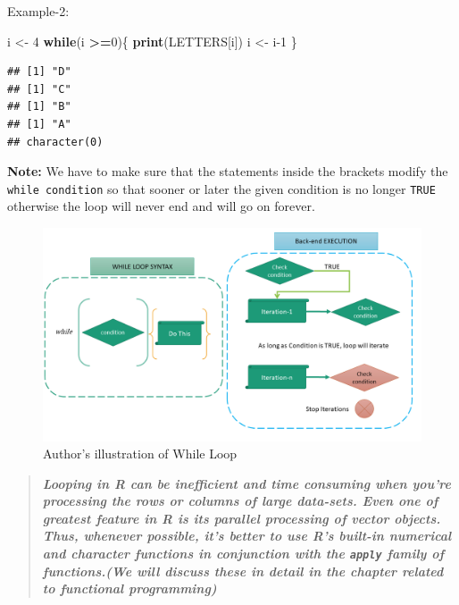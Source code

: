 \documentclass[
]{book}
\newenvironment{Shaded}{\begin{snugshade}}{\end{snugshade}}
\newcommand{\ControlFlowTok}[1]{\textcolor[rgb]{0.13,0.29,0.53}{\textbf{#1}}}
\newcommand{\DecValTok}[1]{\textcolor[rgb]{0.00,0.00,0.81}{#1}}
\newcommand{\FunctionTok}[1]{\textcolor[rgb]{0.13,0.29,0.53}{\textbf{#1}}}
\newcommand{\NormalTok}[1]{#1}
\newcommand{\OtherTok}[1]{\textcolor[rgb]{0.56,0.35,0.01}{#1}}
\newcommand{\SpecialCharTok}[1]{\textcolor[rgb]{0.81,0.36,0.00}{\textbf{#1}}}
\begin{document}
Example-2:

\begin{Shaded}
\begin{Highlighting}[]
\NormalTok{i }\OtherTok{\textless{}{-}} \DecValTok{4}
\ControlFlowTok{while}\NormalTok{(i }\SpecialCharTok{\textgreater{}=}\DecValTok{0}\NormalTok{)\{}
  \FunctionTok{print}\NormalTok{(LETTERS[i])}
\NormalTok{  i }\OtherTok{\textless{}{-}}\NormalTok{ i}\DecValTok{{-}1}
\NormalTok{\}}
\end{Highlighting}
\end{Shaded}

\begin{verbatim}
## [1] "D"
## [1] "C"
## [1] "B"
## [1] "A"
## character(0)
\end{verbatim}

\textbf{Note:} We have to make sure that the statements inside the brackets modify the \texttt{while\ condition} so that sooner or later the given condition is no longer \texttt{TRUE} otherwise the loop will never end and will go on forever.

\begin{figure}

{\centering \includegraphics[width=0.99\linewidth]{images/while_loop} 

}

\caption{Author's illustration of While Loop}\label{fig:unnamed-chunk-176}
\end{figure}

\begin{quote}
\textbf{\emph{Looping in R can be inefficient and time consuming when you're processing the rows or columns of large data-sets. Even one of greatest feature in R is its parallel processing of vector objects. Thus, whenever possible, it's better to use R's built-in numerical and character functions in conjunction with the \texttt{apply} family of functions.(We will discuss these in detail in the chapter related to functional programming)}}
\end{quote}
\end{document}
